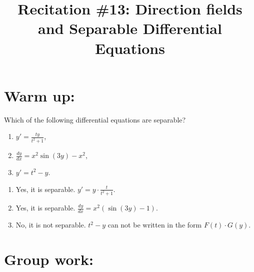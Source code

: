 \documentclass[handout]{ximera}
\title{Recitation \#13: Direction fields and Separable Differential Equations}
\begin{document}
\begin{abstract}		\end{abstract}
\maketitle




\section{Warm up:}
	Which of the following differential equations are separable?
	\begin{enumerate}
	\item $y' = \frac{ty}{t^2+1}$,
	\item $\frac{dy}{dx} =x^2 \sin (3y) -x^2$,
	\item $y' = t^2 - y$.
	\end{enumerate}

	\begin{freeResponse}
	\begin{enumerate}
	\item Yes, it is separable. $y' = y \cdot \frac{t}{t^2+1}$.
	\item Yes, it is separable. $\frac{dy}{dx} = x^2 \left( \sin(3y)-1 \right)$.
	\item No, it is not separable. $t^2-y$ can not be written in the form $F(t) \cdot G(y)$. 
	\end{enumerate}
	\end{freeResponse}
	
\begin{instructorNotes}

\end{instructorNotes}








\section{Group work:}
\end{document}
